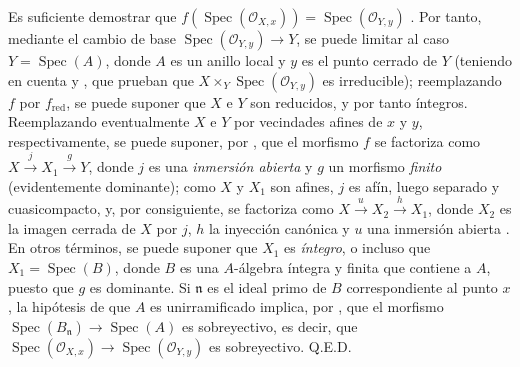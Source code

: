 Es suficiente demostrar que $f(\operatorname{Spec}(\mathcal O_{X,x}))=\operatorname{Spec}(\mathcal O_{Y,y})$ .
Por tanto, mediante el cambio de base $\operatorname{Spec}(\mathcal O_{Y,y})\to Y$, se puede limitar al caso $Y=\operatorname{Spec}(A)$, donde $A$ es un anillo local y $y$ es el punto cerrado de $Y$ (teniendo en cuenta  y , que prueban que $X\times_Y\operatorname{Spec}(\mathcal O_{Y,y})$ es irreducible); reemplazando $f$ por $f_{\mathrm{red}}$, se puede suponer que $X$ e $Y$ son reducidos, y por tanto íntegros.
Reemplazando eventualmente $X$ e $Y$ por vecindades afines de $x$ y $y$, respectivamente, se puede suponer, por , que el morfismo $f$ se factoriza como $X\xrightarrow{j}X_1\xrightarrow{g}Y$, donde $j$ es una \emph{inmersión abierta} y $g$ un morfismo \emph{finito} (evidentemente dominante); como $X$ y $X_1$ son afines, $j$ es afín, luego separado y cuasicompacto, y, por consiguiente, se factoriza como $X\xrightarrow{u}X_2\xrightarrow{h}X_1$, donde $X_2$ es la imagen cerrada de $X$ por $j$, $h$ la inyección canónica y $u$ una inmersión abierta .
En otros términos, se puede suponer que $X_1$ es \emph{íntegro}, o incluso que $X_1=\operatorname{Spec}(B)$, donde $B$ es una $A$-álgebra íntegra y finita que contiene a $A$, puesto que $g$ es dominante. Si $\mathfrak n$ es el ideal primo de $B$ correspondiente al punto $x$, la hipótesis de que $A$ es unirramificado implica, por , que el morfismo $\operatorname{Spec}(B_{\mathfrak n})\to\operatorname{Spec}(A)$ es sobreyectivo, es decir, que $\operatorname{Spec}(\mathcal O_{X,x})\to\operatorname{Spec}(\mathcal O_{Y,y})$ es sobreyectivo.
Q.E.D.

